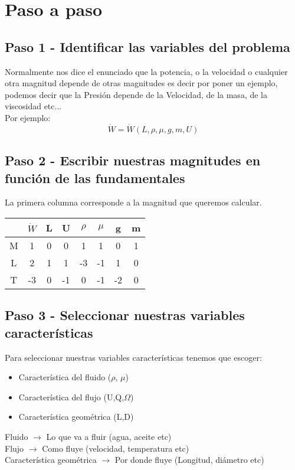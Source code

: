 \documentclass[10pt,a4paper]{article}
\begin{document}
 \newpage
\section{Paso a paso}
\subsection{Paso 1 - Identificar las variables del problema}
Normalmente nos dice el enunciado que la potencia, o la velocidad o cualquier otra magnitud depende de otras magnitudes es decir por poner un ejemplo, podemos decir que la Presión depende de la Velocidad, de la masa, de la viscosidad etc...
\\

Por ejemplo:
$$
\dot{W} = \dot{W} \left(L,\rho,\mu,g,m,U \right)
$$

\subsection{Paso 2 - Escribir nuestras magnitudes en función de las fundamentales}
La primera columna corresponde a la magnitud que queremos calcular.
\begin{center}
\begin{tabular}{ c | c | c | c | c | c | c | c}
  & \cellcolor{red!25}$\dot{W}$ & L & U & $\rho$ & $\mu$ & g & m\\
    \hline
    M & 1 & 0 & 0  & 1 & 1 & 0 & 1 \\
    L & 2 & 1 & 1 & -3 & -1 & 1 & 0\\
    T & -3 & 0 & -1 & 0 & -1 & -2 & 0\\
 \end{tabular}
 \end{center}
 

 \subsection{Paso 3 - Seleccionar nuestras variables características}
 Para seleccionar nuestras variables características tenemos que escoger:
 \begin{itemize}
     \item Característica del fluido ($\rho$, $\mu$) 
     \item Característica del flujo (U,Q,$\Omega$)
     \item Característica geométrica (L,D)
 \end{itemize}
 Fluido $\xrightarrow{}$ Lo que va a fluir (agua, aceite etc)
 \\
 Flujo $\xrightarrow{}$ Como fluye (velocidad, temperatura etc)
 \\
 Característica geométrica $\xrightarrow{}$ Por donde fluye (Longitud, diámetro etc)
 \\
 
\end{document}
